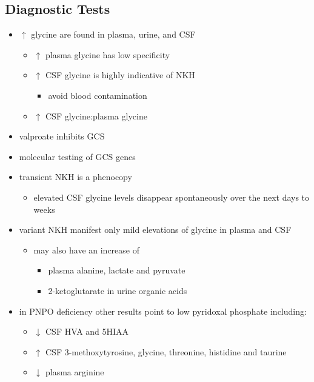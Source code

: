 \documentclass[12pt]{scrartcl}
\begin{document}
\begin{center}
\begin{center}
\subsection{Diagnostic Tests}
\label{sec:org5a0f270}
\begin{itemize}
\item \(\uparrow\) glycine are found in plasma, urine, and CSF
\begin{itemize}
\item \(\uparrow\) plasma glycine has low specificity
\item \(\uparrow\) CSF glycine is highly indicative of NKH
\begin{itemize}
\item avoid blood contamination
\end{itemize}
\item \(\uparrow\) CSF glycine:plasma glycine
\end{itemize}
\item valproate inhibits GCS
\item molecular testing of GCS genes
\item transient NKH is a phenocopy
\begin{itemize}
\item elevated CSF glycine levels disappear spontaneously over the next
days to weeks
\end{itemize}
\item variant NKH manifest only mild elevations of glycine in plasma and CSF
\begin{itemize}
\item may also have an increase of
\begin{itemize}
\item plasma alanine, lactate and pyruvate
\item 2-ketoglutarate in urine organic acids
\end{itemize}
\end{itemize}
\item in PNPO deficiency other results point to low pyridoxal phosphate
including:
\begin{itemize}
\item \(\downarrow\) CSF HVA and 5HIAA
\item \(\uparrow\) CSF 3-methoxytyrosine, glycine, threonine, histidine and
taurine
\item \(\downarrow\) plasma arginine
\end{itemize}
\end{itemize}


\end{center}
\end{center}
\end{document}
